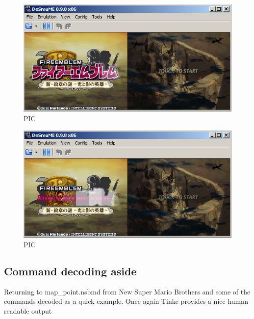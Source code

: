 \documentclass[
]{book}
\begin{document}
\begin{figure}
\centering
\includegraphics{images/77_home_fast6191_romhackingguide_unrenamed_file___gguidegraphics3dminorNSMBDtexturedecoding_9.png}
\caption{PIC}
\end{figure}

\begin{figure}
\centering
\includegraphics{images/78_home_fast6191_romhackingguide_unrenamed_file___gguidegraphics3dminorNSMBDtexturedecoding_8.png}
\caption{PIC}
\end{figure}

\hypertarget{command-decoding-aside}{%
\subsection{Command decoding aside}\label{command-decoding-aside}}

Returning to map\_point.nsbmd from New Super Mario Brothers and some of the commands decoded as a quick example. Once again Tinke provides a nice human readable output
\end{document}
